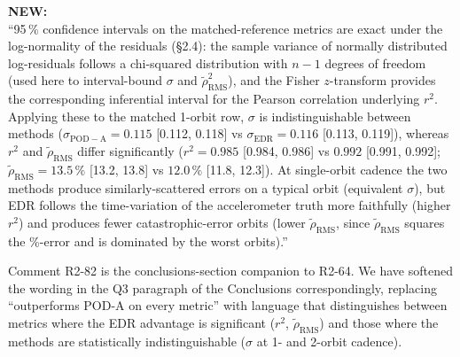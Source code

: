 \documentclass[11pt]{article}
\newcommand{\newtext}[1]{%
  \smallskip
  \noindent\hspace{1em}\begin{minipage}{0.92\textwidth}%
  \color{quotegreen}\textbf{NEW:}\\[2pt]``#1''%
  \end{minipage}%
  \smallskip
}
\begin{document}
\newtext{95\,\% confidence intervals on the matched-reference metrics are exact under the log-normality of the residuals (\S2.4): the sample variance of normally distributed log-residuals follows a chi-squared distribution with $n-1$ degrees of freedom (used here to interval-bound $\sigma$ and $\tilde{\rho}_{\mathrm{RMS}}^{2}$), and the Fisher $z$-transform provides the corresponding inferential interval for the Pearson correlation underlying $r^{2}$. Applying these to the matched 1-orbit row, $\sigma$ is indistinguishable between methods ($\sigma_{\mathrm{POD-A}} = 0.115$ [0.112, 0.118] vs $\sigma_{\mathrm{EDR}} = 0.116$ [0.113, 0.119]), whereas $r^{2}$ and $\tilde{\rho}_{\mathrm{RMS}}$ differ significantly ($r^{2} = 0.985$ [0.984, 0.986] vs $0.992$ [0.991, 0.992]; $\tilde{\rho}_{\mathrm{RMS}} = 13.5\,\%$ [13.2, 13.8] vs $12.0\,\%$ [11.8, 12.3]). At single-orbit cadence the two methods produce similarly-scattered errors on a typical orbit (equivalent $\sigma$), but EDR follows the time-variation of the accelerometer truth more faithfully (higher $r^{2}$) and produces fewer catastrophic-error orbits (lower $\tilde{\rho}_{\mathrm{RMS}}$, since $\tilde{\rho}_{\mathrm{RMS}}$ squares the \%-error and is dominated by the worst orbits).}

\medskip
\noindent Comment R2-82 is the conclusions-section companion to R2-64. We have softened the wording in the Q3 paragraph of the Conclusions correspondingly, replacing ``outperforms POD-A on every metric'' with language that distinguishes between metrics where the EDR advantage is significant ($r^{2}$, $\tilde{\rho}_{\mathrm{RMS}}$) and those where the methods are statistically indistinguishable ($\sigma$ at 1- and 2-orbit cadence).
\end{document}
